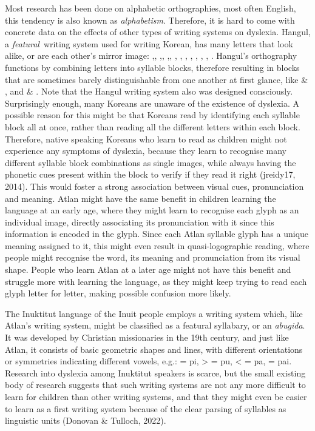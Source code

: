 Most research has been done on alphabetic orthographies, most often English, this tendency is also known as {\it alphabetism}. Therefore, it is hard to come with concrete data on the effects of other types of writing systems on dyslexia. Hangul, a {\it featural}\ writing system used for writing Korean, has many letters that look alike, or are each other’s mirror image: ,, ,, ,, , , , , , , , . Hangul’s orthography functions by combining letters into syllable blocks, therefore resulting in blocks that are sometimes barely distinguishable from one another at first glance, like  \& , and  \& . Note that the Hangul writing system also was designed consciously. Surprisingly enough, many Koreans are unaware of the existence of dyslexia. A possible reason for this might be that Koreans read by identifying each syllable block all at once, rather than reading all the different letters within each block. Therefore, native speaking Koreans who learn to read as children might not experience any symptoms of dyslexia, because they learn to recognise many different syllable block combinations as single images, while always having the phonetic cues present within the block to verify if they read it right (jreidy17, 2014). This would foster a strong association between visual cues, pronunciation and meaning. Atlan might have the same benefit in children learning the language at an early age, where they might learn to recognise each glyph as an individual image, directly associating its pronunciation with it since this information is encoded in the glyph. Since each Atlan syllable glyph has a unique meaning assigned to it, this might even result in quasi-logographic reading, where people might recognise the word, its meaning and pronunciation from its visual shape. People who learn Atlan at a later age might not have this benefit and struggle more with learning the language, as they might keep trying to read each glyph letter for letter, making possible confusion more likely. 

The Inuktitut language of the Inuit people employs a writing system which, like Atlan’s writing system, might be classified as a featural syllabary, or an {\it abugida}. It was developed by Christian missionaries in the 19th century, and just like Atlan, it consists of basic geometric shapes and lines, with different orientations or symmetries indicating different vowels, e.g.:  = pi, > = pu, < = pa,  = pai. Research into dyslexia among Inuktitut speakers is scarce, but the small existing body of research suggests that such writing systems are not any more difficult to learn for children than other writing systems, and that they might even be easier to learn as a first writing system because of the clear parsing of syllables as linguistic units (Donovan \& Tulloch, 2022).  

